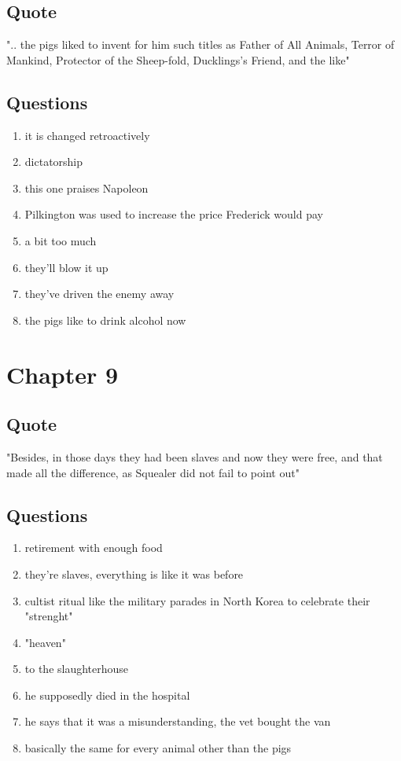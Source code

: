 \documentclass[8pt, letterpaper]{article}
\begin{document}
\subsection{Quote}
".. the pigs liked to invent for him such titles as Father of All Animals, Terror of Mankind, Protector of the Sheep-fold, Ducklings's Friend, and the like"

\subsection{Questions}
\begin{enumerate}
  \item it is changed retroactively
  \item dictatorship
  \item this one praises Napoleon
  \item Pilkington was used to increase the price Frederick would pay
  \item a bit too much
  \item they'll blow it up
  \item they've driven the enemy away
  \item the pigs like to drink alcohol now
\end{enumerate}

\section{Chapter 9}

\subsection{Quote}
"Besides, in those days they had been slaves and now they were free, and that made all the difference, as Squealer did not fail to point out"

\subsection{Questions}
\begin{enumerate}
  \item retirement with enough food
  \item they're slaves, everything is like it was before
  \item cultist ritual like the military parades in North Korea to celebrate their "strenght"
  \item "heaven"
  \item to the slaughterhouse
  \item he supposedly died in the hospital
  \item he says that it was a misunderstanding, the vet bought the van
  \item basically the same for every animal other than the pigs
\end{enumerate}
\end{document}
